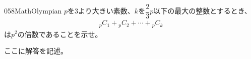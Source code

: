 \begin{prob}{058}{}{MathOlympian}
 $p$を3より大きい素数、$k$を$\dfrac{2}{3}p$以下の最大の整数とするとき、
 \begin{align*}
  {}_pC_1+{}_pC_2+\cdots+{}_pC_k
 \end{align*}
 は$p^2$の倍数であることを示せ。
\end{prob}
ここに解答を記述。